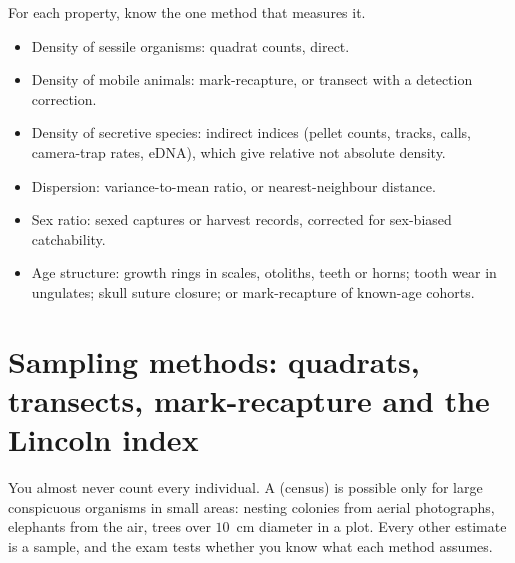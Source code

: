 \begin{tipbox}[title={TECHNIQUE: matching the property to the method}]
For each property, know the one method that measures it.
\begin{itemize}
\item Density of sessile organisms: quadrat counts, direct.
\item Density of mobile animals: mark-recapture, or transect with a detection
correction.
\item Density of secretive species: indirect indices (pellet counts, tracks,
calls, camera-trap rates, eDNA), which give relative not absolute density.
\item Dispersion: variance-to-mean ratio, or nearest-neighbour distance.
\item Sex ratio: sexed captures or harvest records, corrected for
sex-biased catchability.
\item Age structure: growth rings in scales, otoliths, teeth or horns; tooth wear
in ungulates; skull suture closure; or mark-recapture of known-age cohorts.
\end{itemize}
\end{tipbox}

\section{Sampling methods: quadrats, transects, mark-recapture and the Lincoln index}

You almost never count every individual. A  (census) is possible
only for large conspicuous organisms in small areas: nesting colonies from aerial
photographs, elephants from the air, trees over $10$~cm diameter in a plot. Every
other estimate is a sample, and the exam tests whether you know what each method
assumes.

